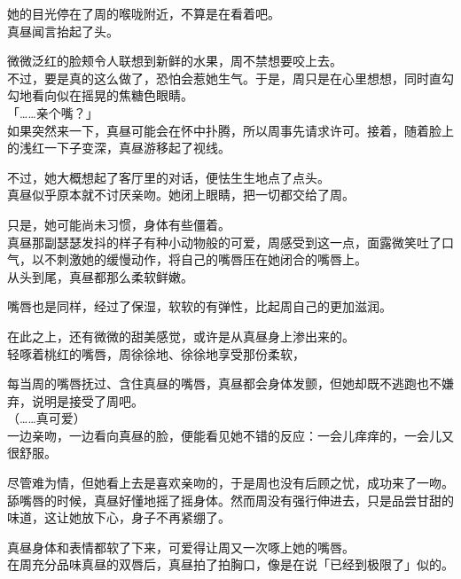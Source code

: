 她的目光停在了周的喉咙附近，不算是在看着吧。\\

真昼闻言抬起了头。

微微泛红的脸颊令人联想到新鲜的水果，周不禁想要咬上去。\\

不过，要是真的这么做了，恐怕会惹她生气。于是，周只是在心里想想，同时直勾勾地看向似在摇晃的焦糖色眼睛。\\

「……亲个嘴？」\\

如果突然来一下，真昼可能会在怀中扑腾，所以周事先请求许可。接着，随着脸上的浅红一下子变深，真昼游移起了视线。

不过，她大概想起了客厅里的对话，便怯生生地点了点头。\\

真昼似乎原本就不讨厌亲吻。她闭上眼睛，把一切都交给了周。

只是，她可能尚未习惯，身体有些僵着。\\

真昼那副瑟瑟发抖的样子有种小动物般的可爱，周感受到这一点，面露微笑吐了口气，以不刺激她的缓慢动作，将自己的嘴唇压在她闭合的嘴唇上。\\

从头到尾，真昼都那么柔软鲜嫩。

嘴唇也是同样，经过了保湿，软软的有弹性，比起周自己的更加滋润。

在此之上，还有微微的甜美感觉，或许是从真昼身上渗出来的。\\

轻啄着桃红的嘴唇，周徐徐地、徐徐地享受那份柔软，

每当周的嘴唇抚过、含住真昼的嘴唇，真昼都会身体发颤，但她却既不逃跑也不嫌弃，说明是接受了周吧。\\

（……真可爱）\\

一边亲吻，一边看向真昼的脸，便能看见她不错的反应：一会儿痒痒的，一会儿又很舒服。

尽管难为情，但她看上去是喜欢亲吻的，于是周也没有后顾之忧，成功来了一吻。\\

舔嘴唇的时候，真昼好懂地摇了摇身体。然而周没有强行伸进去，只是品尝甘甜的味道，这让她放下心，身子不再紧绷了。

真昼身体和表情都软了下来，可爱得让周又一次啄上她的嘴唇。\\

在周充分品味真昼的双唇后，真昼拍了拍胸口，像是在说「已经到极限了」似的。\\

